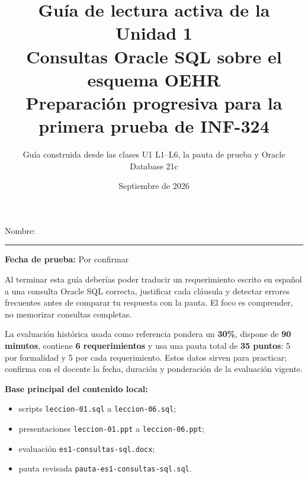 \documentclass[11pt,a4paper]{article}
\title{\textbf{Guía de lectura activa de la Unidad 1}\\[0.3em]
\large Consultas Oracle SQL sobre el esquema OEHR\\[0.5em]
\normalsize Preparación progresiva para la primera prueba de INF-324}
\author{Guía construida desde las clases U1 L1--L6, la pauta de prueba y Oracle Database 21c}
\date{Septiembre de 2026}
\newcommand{\NombreEstudiante}{Nombre: \rule{6cm}{0.4pt}}
\newcommand{\FechaPrueba}{Por confirmar}
\newcommand{\campo}[1]{\texttt{#1}}
\begin{document}
\maketitle
\thispagestyle{empty}

\begin{center}
\NombreEstudiante \hfill \textbf{Fecha de prueba:} \FechaPrueba
\end{center}

\begin{objetivo}
Al terminar esta guía deberías poder traducir un requerimiento escrito en español a una consulta
Oracle SQL correcta, justificar cada cláusula y detectar errores frecuentes antes de comparar tu
respuesta con la pauta. El foco es comprender, no memorizar consultas completas.
\end{objetivo}

\vfill

\begin{center}
\end{center}

\begin{prueba}
La evaluación histórica usada como referencia pondera un \textbf{30\%}, dispone de
\textbf{90 minutos}, contiene \textbf{6 requerimientos} y usa una pauta total de
\textbf{35 puntos}: 5 por formalidad y 5 por cada requerimiento. Estos datos sirven para practicar;
confirma con el docente la fecha, duración y ponderación de la evaluación vigente.
\end{prueba}

\vfill

\begin{flushleft}
\textbf{Base principal del contenido local:}
\begin{itemize}
  \item scripts \campo{leccion-01.sql} a \campo{leccion-06.sql};
  \item presentaciones \campo{leccion-01.ppt} a \campo{leccion-06.ppt};
  \item evaluación \campo{es1-consultas-sql.docx};
  \item pauta revisada \campo{pauta-es1-consultas-sql.sql}.
\end{itemize}
\end{flushleft}
\end{document}
